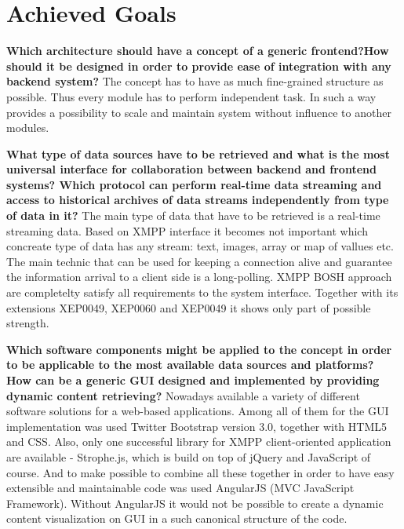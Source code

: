\section{Achieved Goals}
	   \textbf{Which architecture should have a concept of a generic frontend?How should it be designed in order to provide ease of integration with any backend system?}
	   \newline
	   The concept has to have as much fine-grained structure as possible. Thus every module has to perform independent task. In such a way provides a possibility to scale and maintain system without influence to another modules. 

       \textbf{What type of data sources have to be retrieved and what is the most universal interface for collaboration between backend and frontend systems? Which protocol can perform real-time data streaming and access to historical archives of data streams independently from type of data in it?}
       \newline
       The main type of data that have to be retrieved is a real-time streaming data. Based on XMPP interface it becomes not important which concreate type of data has any stream: text, images, array or map of vallues etc. The main technic that can be used for keeping a connection alive and guarantee the information arrival to a client side is a long-polling. 
       \newline
       XMPP BOSH approach are completelty satisfy all requirements to the system interface. Together with its extensions XEP0049, XEP0060 and XEP0049 it shows only part of possible strength.

       \textbf{Which software components might be applied to the concept in order to be applicable to the most available data sources and platforms? How can be a generic GUI designed and implemented by providing dynamic content retrieving?} 
       \newline
       Nowadays available a variety of different software solutions for a web-based applications. Among all of them for the GUI implementation was used Twitter Bootstrap version 3.0, together with HTML5 and CSS. Also, only one successful library for XMPP client-oriented application are available - Strophe.js, which is build on top of jQuery and JavaScript of course. And to make possible to combine all these together in order to have easy extensible and maintainable code was used AngularJS (MVC JavaScript Framework). Without AngularJS it would not be possible to create a dynamic content visualization on GUI in a such canonical structure of the code.

